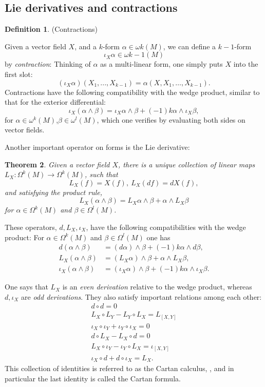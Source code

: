 \documentclass{article}
\newtheorem{theorem}{Theorem}[section]
\theoremstyle{definition}
\newtheorem{defn}[theorem]{Definition}
\newenvironment{definition}
  {\vspace{8pt}\begin{mdframed}[backgroundcolor=blueish]\begin{defn}}
  {\end{defn}\end{mdframed}\vspace{4pt}}
\begin{document}
\subsection{Lie derivatives and contractions}

\begin{definition} (Contractions)

Given a vector field $X$, and a $k$-form $\alpha  \in \omega k (M)$, we can define a $k-1$-form 
\[
    \iota_X \alpha \in \omega  k-1 (M)
\] by \textit{contraction}: Thinking of $\alpha $ as a multi-linear form, one simply puts $X$ into the first slot:
\[
    (\iota_X\alpha )(X_1,...,X_{k-1}) = \alpha (X,X_1,\dots,X_{k-1}).
\]
Contractions have the following compatibility with the wedge product, similar to that for the exterior differential: 
\[
    \iota_X (\alpha  \wedge \beta ) = \iota_X\alpha  \wedge \beta  + (-1) k\alpha  \wedge \iota_X \beta , 
\]
for $\alpha  \in \omega^k (M)$,$\beta  \in \omega^l (M)$, which one verifies by evaluating both sides on vector fields.
\end{definition}

Another important operator on forms is the Lie derivative:

\begin{theorem}
Given a vector field $X$, there is a unique collection of linear maps $L_X : \Omega^k (M) \rightarrow \Omega^k (M)$, such that 
\[ 
    L_X (f) = X(f), \ L_X (d f) = dX(f),
\] 
and satisfying the product rule, 
\[
L_X (\alpha  \wedge \beta ) = L_X \alpha  \wedge \beta  +\alpha  \wedge L_X \beta  
\] 
for $\alpha  \in \Omega^k (M)$ and $\beta  \in \Omega^l (M)$.
\end{theorem}

These operators, $d, L_X, \iota_X$, have the following compatibilities with the wedge product: For $\alpha \in \Omega^k (M)$ and $\beta \in \Omega^l (M)$ one has 
\begin{align*}
d(\alpha \wedge\beta) &= (d\alpha)\wedge\beta + (-1) k\alpha \wedge d\beta,\\
L_X (\alpha \wedge\beta) &= (L_X\alpha)\wedge\beta +\alpha \wedge L_X \beta,\\
\iota_X (\alpha \wedge\beta) &= (\iota_X\alpha)\wedge\beta + (-1) k\alpha \wedge\iota_X \beta.
\end{align*}
  
One says that $L_X$ is an \textit{even derivation} relative to the wedge product, whereas $d,\iota_X$ are \textit{odd derivations}. They also satisfy important relations among each other:
\begin{align*}
    d \circ d = 0 \\
    L_X \circ L_Y -L_Y \circ L_X = L_{[X,Y]} \\
    \iota_X \circ \iota_Y +\iota_Y \circ \iota_X = 0 \\
    d \circ L_X -L_X \circ d = 0 \\
    L_X \circ \iota_Y -\iota_Y \circ L_X = \iota_[X,Y] \\
    \iota_X \circ d+d \circ \iota_X = L_X .
\end{align*}
This collection of identities is referred to as the Cartan calculus, , and in particular the last identity is called the Cartan formula.
\end{document}
